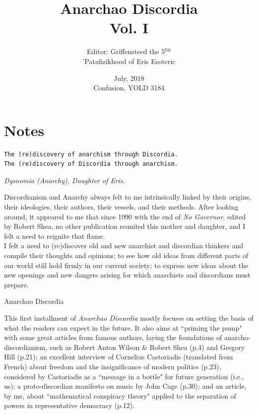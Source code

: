 \documentclass[12pt, onecolumn, letterpaper, oneside]{book}
\title{Anarchao Discordia\\
		\vspace{1\baselineskip}
		\large{Vol. I}
		}
\date{July, 2018\\
		 Confusion, YOLD 3184}
\author{Editor: Griffensteed the 5$^\text{lth}$\\
			'Patafizikhood of Eris Esoteric\\}
\begin{document}
\sloppy

\maketitle

\tableofcontents

\chapter*{Notes}
\begin{verbatim}
The (re)discovery of anarchism through Discordia.
The (re)discovery of Discordia through anarchism.           
\end{verbatim}

\begin{center}
\emph{Dysnomia (Anarchy), Daughter of Eris.}\\
\end{center}

Discordianism and Anarchy always felt to me intrinsically linked by their origins, their ideologies, their authors, their vessels, and their methods. After looking around, it appeared to me that since 1990 with the end of \emph{No Governor}, edited by Robert Shea, no other publication reunited this mother and daughter, and I felt a need to reignite that flame.\\
I felt a need to (re)discover old and new anarchist and discordian thinkers and compile their thoughts and opinions; to see how old ideas from different parts of our world still hold firmly in our current society; to express new ideas about the new openings and new dangers arising for which anarchists and discordians must prepare.\\

\begin{center}
Anarchao Discordia\\
\end{center}

This first installment of \emph{Anarchao Discordia} mostly focuses on setting the basis of what the readers can expect in the future. It also aims at ``priming the pump" with some great articles from famous authors, laying the foundations of anarcho-discordianism, such as Robert Anton Wilson \& Robert Shea (p.4) and Gregory Hill (p.21); an excellent interview of Cornelius Castoriadis (translated from French) about freedom and the insignificance of modern politics (p.23), considered by Castoriadis as a ``message in a bottle" for future generation (i.e., us); a proto-discordian manifesto on music by John Cage (p.30); and an article, by me, about ``mathematical conspiracy theory" applied to the separation of powers in representative democracy (p.12).\\
\end{document}
